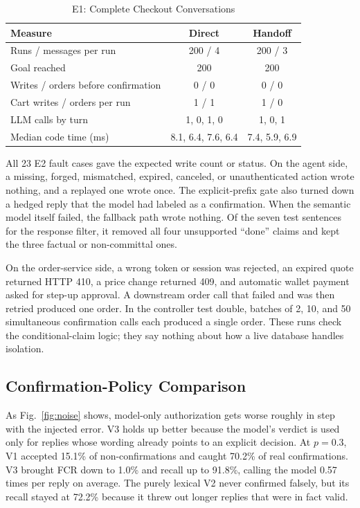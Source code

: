 \documentclass{IEEEtran}
\begin{document}
\begin{table}[t]
\caption{E1: Complete Checkout Conversations}
\label{tab:e1}
\centering
\footnotesize
\setlength{\tabcolsep}{4pt}
\begin{tabular}{@{}lcc@{}}
\toprule
Measure & Direct & Handoff \\
\midrule
Runs / messages per run & 200 / 4 & 200 / 3 \\
Goal reached & 200 & 200 \\
Writes / orders before confirmation & 0 / 0 & 0 / 0 \\
Cart writes / orders per run & 1 / 1 & 1 / 0 \\
LLM calls by turn & 1, 0, 1, 0 & 1, 0, 1 \\
Median code time (ms) & 8.1, 6.4, 7.6, 6.4 & 7.4, 5.9, 6.9 \\
\bottomrule
\end{tabular}
\end{table}

All 23 E2 fault cases gave the expected write count or status. On the agent side, a missing, forged, mismatched, expired, canceled, or unauthenticated action wrote nothing, and a replayed one wrote once. The explicit-prefix gate also turned down a hedged reply that the model had labeled as a confirmation. When the semantic model itself failed, the fallback path wrote nothing. Of the seven test sentences for the response filter, it removed all four unsupported ``done'' claims and kept the three factual or non-committal ones.

On the order-service side, a wrong token or session was rejected, an expired quote returned HTTP 410, a price change returned 409, and automatic wallet payment asked for step-up approval. A downstream order call that failed and was then retried produced one order. In the controller test double, batches of 2, 10, and 50 simultaneous confirmation calls each produced a single order. These runs check the conditional-claim logic; they say nothing about how a live database handles isolation.

\subsection{Confirmation-Policy Comparison}

As Fig.~\ref{fig:noise} shows, model-only authorization gets worse roughly in step with the injected error. V3 holds up better because the model's verdict is used only for replies whose wording already points to an explicit decision. At $p=0.3$, V1 accepted 15.1\% of non-confirmations and caught 70.2\% of real confirmations. V3 brought FCR down to 1.0\% and recall up to 91.8\%, calling the model 0.57 times per reply on average. The purely lexical V2 never confirmed falsely, but its recall stayed at 72.2\% because it threw out longer replies that were in fact valid.
\end{document}
